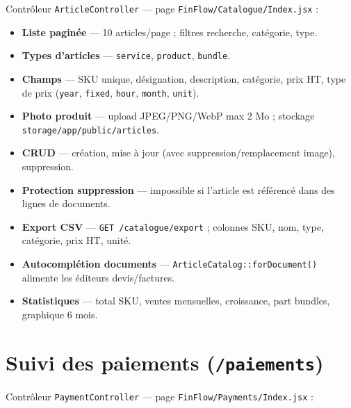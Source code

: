 \documentclass[11pt,a4paper]{report}
\newcommand{\route}[1]{\texttt{\small #1}}
\newcommand{\ctrl}[1]{\texttt{\small #1}}
\newcommand{\svc}[1]{\texttt{\small #1}}
\newcommand{\feat}[1]{\textbf{#1}}
\begin{document}
Contrôleur \ctrl{ArticleController} — page \texttt{FinFlow/Catalogue/Index.jsx} :

\begin{itemize}[leftmargin=*]
    \item \feat{Liste paginée} — 10 articles/page ; filtres recherche, catégorie, type.
    \item \feat{Types d'articles} — \texttt{service}, \texttt{product}, \texttt{bundle}.
    \item \feat{Champs} — SKU unique, désignation, description, catégorie, prix HT, type de prix (\texttt{year}, \texttt{fixed}, \texttt{hour}, \texttt{month}, \texttt{unit}).
    \item \feat{Photo produit} — upload JPEG/PNG/WebP max 2 Mo ; stockage \texttt{storage/app/public/articles}.
    \item \feat{CRUD} — création, mise à jour (avec suppression/remplacement image), suppression.
    \item \feat{Protection suppression} — impossible si l'article est référencé dans des lignes de documents.
    \item \feat{Export CSV} — \route{GET /catalogue/export} ; colonnes SKU, nom, type, catégorie, prix HT, unité.
    \item \feat{Autocomplétion documents} — \svc{ArticleCatalog::forDocument()} alimente les éditeurs devis/factures.
    \item \feat{Statistiques} — total SKU, ventes mensuelles, croissance, part bundles, graphique 6 mois.
\end{itemize}

\section{Suivi des paiements (\route{/paiements})}

Contrôleur \ctrl{PaymentController} — page \texttt{FinFlow/Payments/Index.jsx} :
\end{document}
